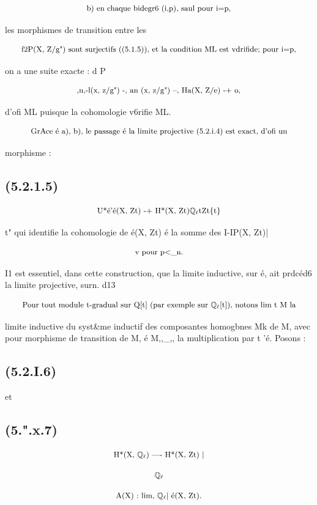 \documentclass[11pt]{article}
\theoremstyle{remark}
\begin{document}
\[\text{\small b) en chaque bidegr6 (i,p), saul pour i=p,}\]

les morphismes de transition entre les

\[\text{\small f2P(X, Z/g") sont surjectifs ((5.1.5)), et la condition ML est vdrifide; pour i=p,}\]

on a une suite exacte : d P

\[\text{\small ,n,-l(x, z/g") -, an (x, z/g") --, Ha(X, Z/e) -+ o,}\]

d'ofi ML puisque la cohomologie v6rifie ML.

\[\text{\small GrAce é a), b), le passage é la limite projective (5.2.i.4) est exact, d'ofi un}\]

morphisme :

\subsection*{(5.2.1.5)}

\[\text{\small U*é'é(X, Zt) -+ H*(X, Zt)\(\mathbb{Q}_{\ell}\)tZt\{t\}}\]

t" qui identifie la cohomologie de é(X, Zt) é la somme des I-IP(X, Zt)|

\[\text{\small v pour p<\_n.}\]

I1 est essentiel, dans cette construction, que la limite inductive, sur é, ait prdcéd6 la limite projective, surn. d13

\[\text{\small Pour tout module t-gradual sur Q[t] (par exemple sur \(\mathbb{Q}_{\ell}\)[t]), notons lim t M la}\]

limite inductive du syst\&me inductif des composantes homogbnes Mk de M, avec pour morphisme de transition de M, é M,,\_,, la multiplication par t 'é. Posons :

\subsection*{(5.2.I.6)}

et

\subsection*{(5.".x.7)}

\[\text{\small H*(X, \(\mathbb{Q}_{\ell}\)) ---- H*(X, Zt) |}\]

\[\text{\small \(\mathbb{Q}_{\ell}\)}\]

\[\text{\small A(X) : lim, \(\mathbb{Q}_{\ell}\)| é(X, Zt).}\]
\end{document}
